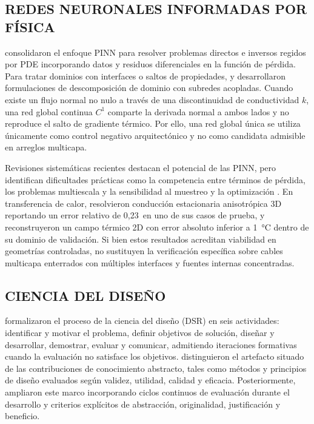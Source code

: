 \subsection{REDES NEURONALES INFORMADAS POR FÍSICA}

\textcite[686--690]{raissi2019} consolidaron el enfoque PINN para resolver problemas directos e inversos regidos por PDE incorporando datos y residuos diferenciales en la función de pérdida. Para tratar dominios con interfaces o saltos de propiedades, \textcite{jagtap2020cpinn} y \textcite[1--2]{shukla2021} desarrollaron formulaciones de descomposición de dominio con subredes acopladas. Cuando existe un flujo normal no nulo a través de una discontinuidad de conductividad $k$, una red global continua $C^1$ comparte la derivada normal a ambos lados y no reproduce el salto de gradiente térmico. Por ello, una red global única se utiliza únicamente como control negativo arquitectónico y no como candidata admisible en arreglos multicapa.

Revisiones sistemáticas recientes destacan el potencial de las PINN, pero identifican dificultades prácticas como la competencia entre términos de pérdida, los problemas multiescala y la sensibilidad al muestreo y la optimización \parencites[1--2,14--17]{lawal2022}[2--6]{ren2025}. En transferencia de calor, \textcite[1,3,17]{xing2023} resolvieron conducción estacionaria anisotrópica 3D reportando un error relativo de 0,23\,\pct{} en uno de sus casos de prueba, y \textcite[1,3,16]{pan2025} reconstruyeron un campo térmico 2D con error absoluto inferior a \SI{1}{\celsius} dentro de su dominio de validación. Si bien estos resultados acreditan viabilidad en geometrías controladas, no sustituyen la verificación específica sobre cables multicapa enterrados con múltiples interfaces y fuentes internas concentradas.

\subsection{CIENCIA DEL DISEÑO}

\textcite[54--56]{peffers2007} formalizaron el proceso de la ciencia del diseño (DSR) en seis actividades: identificar y motivar el problema, definir objetivos de solución, diseñar y desarrollar, demostrar, evaluar y comunicar, admitiendo iteraciones formativas cuando la evaluación no satisface los objetivos. \textcite[342--350]{gregor2013} distinguieron el artefacto situado de las contribuciones de conocimiento abstracto, tales como métodos y principios de diseño evaluados según validez, utilidad, calidad y eficacia. Posteriormente, \textcite[198--203]{delport2024} ampliaron este marco incorporando ciclos continuos de evaluación durante el desarrollo y criterios explícitos de abstracción, originalidad, justificación y beneficio.

